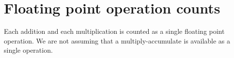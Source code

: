 \section{Floating point operation counts}
\label{appendix:cost}

Each addition and each multiplication is counted as a single floating point
operation. We are not assuming that a multiply-accumulate is available as a
single operation.

\begin{comment}


\subsection{Comparison of computational costs and latency}
Convolutions are best done with the use of the Fast Fourier Transform (FFT).
However there is an inherent latency in performing convolutions this way. This
section describes the computational cost and latency of FFT convolutions, time 
domain (TD) convolutions and TD convolutions with SVD.  

Convolving one filter with data using FFTs involves 
$\mathcal{O}[10 N_s \log_2(N_s)]$
floating point operations where $N_s$ is the number of sample points in
the data being convolved and results in $N_s - N_f$ samples of usable output.  
In comparison time domain convolutions require
$\mathcal{O}[N_s N_f]$ where $N_f$ is the number of sample points in the
filter.  The FFT is faster to compute when $N_f > 10 \log_2(N_s)$.  However
the FFT has an inherent latency of $\mathcal{O}[N_s/f_s]$ seconds, where
$f_s$ is the sample rate when minimally overlapping FFTs are computed. It is
possible to reduce the latency of the FFT by performing vastly overlapping
FFTs.  The cost of such a procedure would be 
$\mathcal{O}[10 N_o N_s \log_2(N_s)]$.  Thus for comparable computational
cost where $N_f \approx 10 N_o \log_2(N_s)$ the latency of the FFT method 
would be $\mathcal{O}[N_s/f_s/N_o]$ seconds.  Depending on the task at hand,
latency requirements and computational costs can dictate what procedure to
use.

\end{comment}

